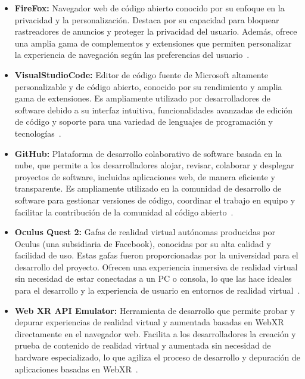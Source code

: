 \documentclass[a4paper, 12pt]{book}
\begin{document}
\begin{itemize}
  \item \textbf{FireFox:} Navegador web de código abierto conocido por su enfoque en la privacidad y la personalización. Destaca por su capacidad 
  para bloquear rastreadores de anuncios y proteger la privacidad del usuario. Además, ofrece una amplia gama de complementos y extensiones que permiten 
  personalizar la experiencia de navegación según las preferencias del usuario~\cite{Firefox}.
  
  \item \textbf{VisualStudioCode:} Editor de código fuente de Microsoft altamente personalizable y de código abierto, conocido por su rendimiento y amplia gama 
  de extensiones. Es ampliamente utilizado por desarrolladores de software debido a su interfaz intuitiva, funcionalidades avanzadas de edición de código y soporte 
  para una variedad de lenguajes de programación y tecnologías~\cite{Vscode}.
  
  \item \textbf{GitHub:} Plataforma de desarrollo colaborativo de software basada en la nube, que permite a los desarrolladores alojar, revisar, colaborar y desplegar 
  proyectos de software, incluidas aplicaciones web, de manera eficiente y transparente. Es ampliamente utilizado en la comunidad de desarrollo de software para gestionar 
  versiones de código, coordinar el trabajo en equipo y facilitar la contribución de la comunidad al código abierto~\cite{Github}.
  
  \item \textbf{Oculus Quest 2:} Gafas de realidad virtual autónomas producidas por Oculus (una subsidiaria de Facebook), conocidas por su alta calidad y facilidad de uso. 
  Estas gafas fueron proporcionadas por la universidad para el desarrollo del proyecto. Ofrecen una experiencia inmersiva de realidad virtual sin necesidad de estar 
  conectadas a un PC o consola, lo que las hace ideales para el desarrollo y la experiencia de usuario en entornos de realidad virtual~\cite{Oculus}.
  
  \item \textbf{Web XR API Emulator:} Herramienta de desarrollo que permite probar y depurar experiencias de realidad virtual y aumentada basadas en WebXR directamente 
  en el navegador web. Facilita a los desarrolladores la creación y prueba de contenido de realidad virtual y aumentada sin necesidad de hardware especializado, lo que 
  agiliza el proceso de desarrollo y depuración de aplicaciones basadas en WebXR~\cite{Webxrapiemulator}.
  
\end{itemize}
\end{document}
